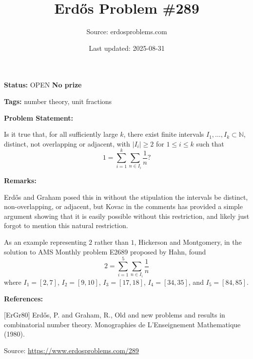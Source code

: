 \documentclass{article}
\title{Erd\H{o}s Problem \#289}
\date{Last updated: 2025-08-31}
\author{Source: erdosproblems.com}
\begin{document}
\maketitle

\noindent\textbf{Status:} OPEN \quad \textbf{No prize}

\noindent\textbf{Tags:} number theory, unit fractions

\medskip
\noindent\textbf{Problem Statement:}

Is it true that, for all sufficiently large $k$, there exist finite intervals $I_1,\ldots,I_k\subset \mathbb{N}$, distinct, not overlapping or adjacent, with $\lvert I_i\rvert \geq 2$ for $1\leq i\leq k$ such that\[1=\sum_{i=1}^k \sum_{n\in I_i}\frac{1}{n}?\]

\bigskip
\noindent\textbf{Remarks:}

Erd\H{o}s and Graham posed this in \cite{ErGr80} without the stipulation the intervals be distinct, non-overlapping, or adjacent, but Kovac in the comments has provided a simple argument showing that it is easily possible without this restriction, and likely \cite{ErGr80} just forgot to mention this natural restriction.

As an example representing $2$ rather than $1$, Hickerson and Montgomery, in the solution to AMS Monthly problem E2689 proposed by Hahn, found\[2=\sum_{i=1}^5 \sum_{n\in I_i}\frac{1}{n}\]where $I_1=[2,7]$, $I_2=[9,10]$, $I_3=[17,18]$, $I_4=[34,35]$, and $I_5=[84,85]$.

\bigskip
\noindent\textbf{References:}

[ErGr80] Erd\H{o}s, P. and Graham, R., Old and new problems and results in combinatorial number theory. Monographies de L'Enseignement Mathematique (1980).

\bigskip
\noindent\small{Source: \url{https://www.erdosproblems.com/289}}
\end{document}

